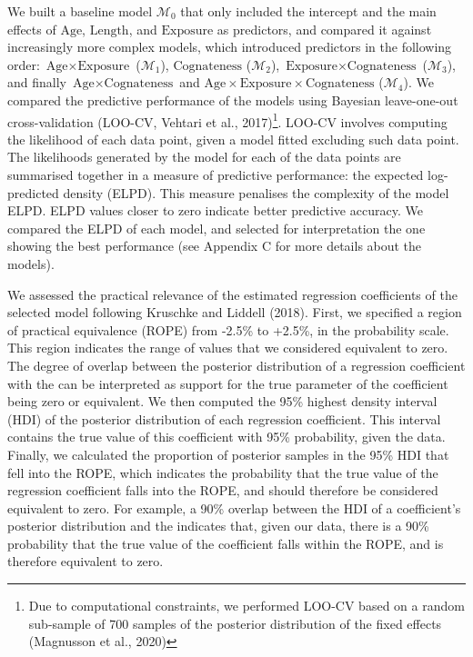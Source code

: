 \documentclass[
  man,
  floatsintext,
  colorlinks=true,linkcolor=blue,citecolor=blue,urlcolor=blue,biblatex]{apa7}
\begin{document}
We built a baseline model \(\mathcal{M}_{0}\) that only included the
intercept and the main effects of \(\text{Age}\), \(\text{Length}\), and
\(\text{Exposure}\) as predictors, and compared it against increasingly
more complex models, which introduced predictors in the following order:
\(\text{Age} \times \text{Exposure}\) (\(\mathcal{M}_{1}\)),
\(\text{Cognateness}\) (\(\mathcal{M}_{2}\)),
\(\text{Exposure} \times \text{Cognateness}\) (\(\mathcal{M}_{3}\)), and
finally \(\text{Age} \times \text{Cognateness}\) and
\(\text{Age} \times \text{Exposure} \times \text{Cognateness}\)
(\(\mathcal{M}_{4}\)). We compared the predictive performance of the
models using Bayesian leave-one-out cross-validation (LOO-CV, Vehtari et
al., 2017)\footnote{Due to computational constraints, we performed
  LOO-CV based on a random sub-sample of 700 samples of the posterior
  distribution of the fixed effects (Magnusson et al., 2020)}. LOO-CV
involves computing the likelihood of each data point, given a model
fitted excluding such data point. The likelihoods generated by the model
for each of the data points are summarised together in a measure of
predictive performance: the expected log-predicted density (ELPD). This
measure penalises the complexity of the model ELPD. ELPD values closer
to zero indicate better predictive accuracy. We compared the ELPD of
each model, and selected for interpretation the one showing the best
performance (see Appendix C for more details about the models).

We assessed the practical relevance of the estimated regression
coefficients of the selected model following Kruschke and Liddell
(2018). First, we specified a region of practical equivalence (ROPE)
from -2.5\% to +2.5\%, in the probability scale. This region indicates
the range of values that we considered equivalent to zero. The degree of
overlap between the posterior distribution of a regression coefficient
with the can be interpreted as support for the true parameter of the
coefficient being zero or equivalent. We then computed the 95\% highest
density interval (HDI) of the posterior distribution of each regression
coefficient. This interval contains the true value of this coefficient
with 95\% probability, given the data. Finally, we calculated the
proportion of posterior samples in the 95\% HDI that fell into the ROPE,
which indicates the probability that the true value of the regression
coefficient falls into the ROPE, and should therefore be considered
equivalent to zero. For example, a 90\% overlap between the HDI of a
coefficient's posterior distribution and the indicates that, given our
data, there is a 90\% probability that the true value of the coefficient
falls within the ROPE, and is therefore equivalent to zero.
\end{document}
